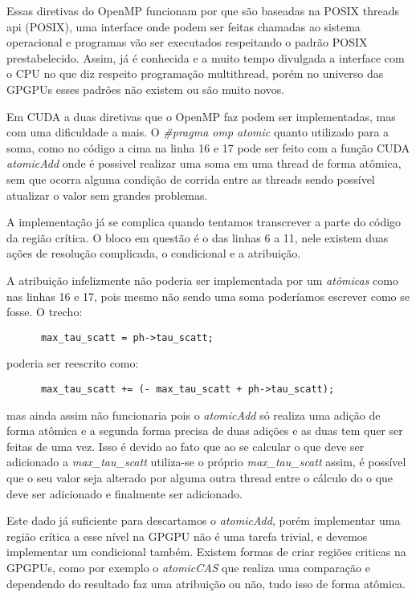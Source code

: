     Essas diretivas do OpenMP funcionam por que são baseadas na POSIX threads api (POSIX), uma interface onde podem ser feitas chamadas ao sistema operacional e programas vão ser executados respeitando o padrão POSIX prestabelecido. Assim, já é conhecida e a muito tempo divulgada a interface com o CPU no que diz respeito programação multithread, porém no universo das GPGPUs esses padrões não existem ou são muito novos.

    Em CUDA a duas diretivas que o OpenMP faz podem ser implementadas, mas com uma dificuldade a mais. O \textit{\#pragma omp atomic} quanto utilizado para a soma, como no código a cima na linha 16 e 17 pode ser feito com a função CUDA \textit{atomicAdd} onde é possivel realizar uma soma em uma thread de forma atômica, sem que ocorra alguma condição de corrida entre as threads sendo possível atualizar o valor sem grandes problemas.

    A implementação já se complica quando tentamos transcrever a parte do código da região crítica. O bloco em questão é o das linhas 6 a 11, nele existem duas ações de resolução complicada, o condicional e a atribuição.

    A atribuição infelizmente não poderia ser implementada por um \textit{atômicas} como nas linhas 16 e 17, pois mesmo não sendo uma soma poderíamos escrever como se fosse. O trecho:
    \begin{lstlisting}
      max_tau_scatt = ph->tau_scatt;
    \end{lstlisting}

    poderia ser reescrito como:

    \begin{lstlisting}
      max_tau_scatt += (- max_tau_scatt + ph->tau_scatt);
    \end{lstlisting}

    mas ainda assim não funcionaria pois o \textit{atomicAdd} só realiza uma adição de forma atômica e a segunda forma precisa de duas adições e as duas tem quer ser feitas de uma vez. Isso é devido ao fato que ao se calcular o que deve ser adicionado a \textit{max\_tau\_scatt} utiliza-se o próprio \textit{max\_tau\_scatt} assim, é possível que o seu valor seja alterado por alguma outra thread entre o cálculo do o que deve ser adicionado e finalmente ser adicionado.

    Este dado já suficiente para descartamos o \textit{atomicAdd}, porém implementar uma região crítica a esse nível na GPGPU não é uma tarefa trivial, e devemos implementar um condicional também. Existem formas de criar regiões criticas na GPGPUs, como por exemplo o \textit{atomicCAS} que realiza uma comparação e dependendo do resultado faz uma atribuição ou não, tudo isso de forma atômica.

